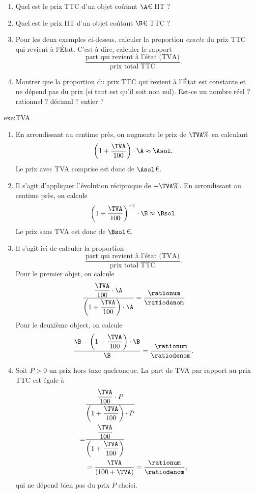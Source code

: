 {	\begin{enumerate}
		\item
		Quel est le prix TTC d'un objet coûtant $\A$€ HT ?
		\item
		Quel est le prix HT d'un objet coûtant $\B$€ TTC ?		
		\item 
		Pour les deux exemples ci-dessus, calculer la proportion \emph{exacte} du prix TTC qui revient à l'État. 
		C'est-à-dire, calculer le rapport
			\[ \dfrac{\text{part qui revient à l'état (TVA)}}{\text{prix total TTC}}. \]
		\item
		Montrer que la proportion du prix TTC qui revient à l'État est constante et ne dépend pas du prix (si tant est qu'il soit non nul).
		Est-ce un nombre réel ? rationnel ? décimal ? entier ?
	\end{enumerate}
}{exe:TVA}{
	\begin{enumerate}
		\item
			En arrondissant au centime près, on augmente le prix de $\TVA\%$ en calculant
				\[ \left(1+\dfrac{\TVA}{100} \right) \cdot \A \approx \Asol. \]
			Le prix avec TVA comprise est donc de $\Asol$€.
		\item
			Il s'agit d'appliquer l'évolution réciproque de $+\TVA\%$.
			En arrondissant au centime près, on calcule
				\[ \left(1+ \dfrac{\TVA}{100}\right)^{-1} \cdot \B \approx \Bsol. \]
			Le prix sans TVA est donc de $\Bsol$€.
		\item
			Il s'agit ici de calculer la proportion 
				\[ \dfrac{\text{part qui revient à l'état (TVA)}}{\text{prix total TTC}}. \]
			Pour le premier objet, on calcule
				\[ \dfrac{\dfrac{\TVA}{100} \cdot \A}{\left(1+\dfrac{\TVA}{100} \right) \cdot \A} = \dfrac{\rationum}{\ratiodenom} \]
			Pour le deuxième object, on calcule
				\[ \dfrac{\B - \left(1- \dfrac{\TVA}{100}\right) \cdot \B }{\B} = \dfrac{\rationum}{\ratiodenom}. \]
		\item
			Soit $P>0$ un prix hors taxe quelconque.
			La part de TVA par rapport au prix TTC est égale à
				\begin{align*}
					& \dfrac{\dfrac{\TVA}{100} \cdot P}{\left(1 + \dfrac{\TVA}{100}\right) \cdot P} \\
					=& \dfrac{\dfrac{\TVA}{100}}{\left(1 + \dfrac{\TVA}{100}\right)} \\
					&= \dfrac{\TVA}{\left(100 + \TVA\right)} = \dfrac{\rationum}{\ratiodenom},
				\end{align*}
			qui ne dépend bien pas du prix $P$ choisi.
	\end{enumerate}
}



